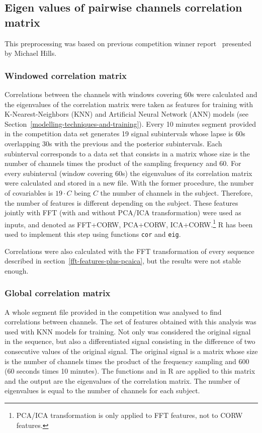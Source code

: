 \documentclass[a4paper,english,twoside]{article}
\begin{document}
\subsection{Eigen values of pairwise channels correlation
  matrix}\label{eigen-values-of-pairwise-channels-correlation-matrix}

This preprocessing was based on previous competition winner
report~\cite{michaelhills} presented by Michael Hills.

\subsubsection{Windowed correlation
  matrix}\label{windowed-correlation-matrix}

Correlations between the channels with windows covering 60s were calculated and
the eigenvalues of the correlation matrix were taken as features for training
with K-Nearest-Neighbors (KNN) and Artificial Neural Network (ANN) models (see
Section~\ref{modelling-techniques-and-training}).  Every 10 minutes segment
provided in the competition data set generates 19 signal subintervals whose
lapse is 60s overlapping 30s with the previous and the posterior subintervals.
Each subinterval corresponds to a data set that consists in a matrix whose size
is the number of channels times the product of the sampling frequency and 60.
For every subinterval (window covering 60s) the eigenvalues of its correlation
matrix were calculated and stored in a new file. With the former procedure, the
number of covariables is $19 \cdot C$ being $C$ the number of channels in the
subject.  Therefore, the number of features is different depending on the
subject. These features jointly with FFT (with and without PCA/ICA
transformation) were used as inputs, and denoted as FFT+CORW,
PCA+CORW, ICA+CORW.\footnote{PCA/ICA transformation is only applied to FFT
  features, not to CORW features.} R has been used to implement this step using
functions \verb+cor+ and \verb+eig+.

Correlations were also calculated with the FFT transformation of every
sequence described in section~\ref{fft-features-plus-pcaica},
but the results were not stable enough.

\subsubsection{Global correlation
  matrix}\label{global-correlation-matrix}

A whole segment file provided in the competition was analysed to find
correlations between channels.  The set of features obtained with this analysis
was used with KNN models for training.  Not only was considered the original
signal in the sequence, but also a differentiated signal consisting in the
difference of two consecutive values of the original signal. The original signal
is a matrix whose size is the number of channels times the product of the
frequency sampling and 600 (60 seconds times 10 minutes). The functions
\verb@eigen@ and \verb@cor@ in R are applied to this matrix and the output are
the eigenvalues of the correlation matrix. The number of eigenvalues is equal to
the number of channels for each subject.
\end{document}
